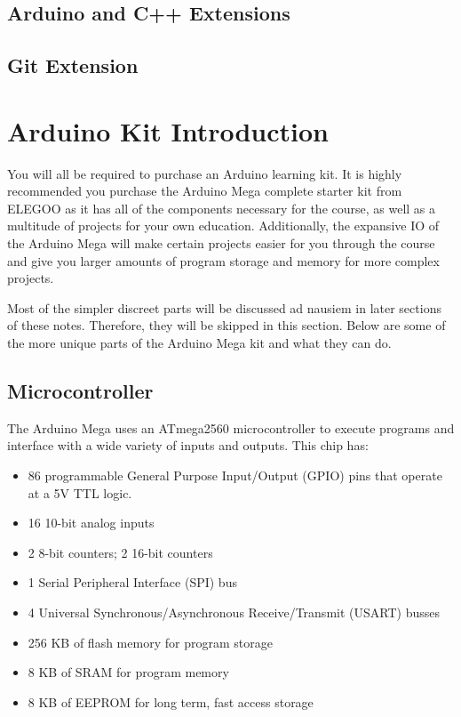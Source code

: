     \subsection*{Arduino and C++ Extensions}

    \subsection*{Git Extension}

\section*{Arduino Kit Introduction}

You will all be required to purchase an Arduino learning kit. 
It is highly recommended you purchase the Arduino Mega complete starter kit from ELEGOO as it has all of the components necessary for the course, as well as a multitude of projects for your own education.
Additionally, the expansive IO of the Arduino Mega will make certain projects easier for you through the course and give you larger amounts of program storage and memory for more complex projects.

Most of the simpler discreet parts will be discussed ad nausiem in later sections of these notes.
Therefore, they will be skipped in this section.
Below are some of the more unique parts of the Arduino Mega kit and what they can do.
    
    \subsection*{Microcontroller}
    The Arduino Mega uses an ATmega2560 microcontroller to execute programs and interface with a wide variety of inputs and outputs.
    This chip has:
    \begin{itemize}
        \item 86 programmable General Purpose Input/Output (GPIO) pins that operate at a 5V TTL logic.
        \item 16 10-bit analog inputs
        \item 2 8-bit counters; 2 16-bit counters
        \item 1 Serial Peripheral Interface (SPI) bus
        \item 4 Universal Synchronous/Asynchronous Receive/Transmit (USART) busses
        \item 256 KB of flash memory for program storage
        \item 8 KB of SRAM for program memory
        \item 8 KB of EEPROM for long term, fast access storage
    \end{itemize}

